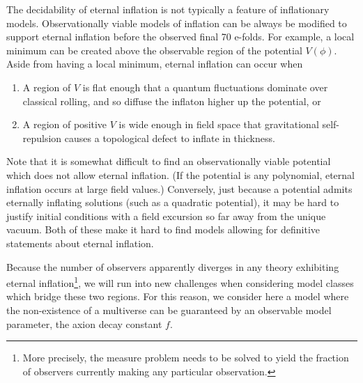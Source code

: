 \documentclass[aps,amsfonts,amsmath,prd,preprint,nofootinbib,superscriptaddress]{revtex4}
\begin{document}
The decidability of eternal inflation is not typically a feature of inflationary models.
 Observationally viable models of inflation can be always be modified to support eternal inflation before the observed final 70 e-folds.   
 For example, a local minimum can be created above the observable region of the potential $V(\phi)$.
 Aside from having a local minimum, eternal inflation can occur when
 \begin{enumerate}
 \item A region of $V$ is flat enough that a quantum fluctuations dominate over classical rolling, and so diffuse the inflaton higher up the potential, or
 \item A region of positive $V$ is wide enough in field space that gravitational self-repulsion causes a topological defect to inflate in thickness.
 \end{enumerate}
 
 Note that it is somewhat difficult to find an observationally viable potential which does not allow eternal inflation\cite{Mukhanov:2014uwa}.  (If the
potential is any polynomial, eternal inflation occurs at large field values.) %
Conversely, just because a potential admits eternally inflating solutions (such as a quadratic potential), it may be hard to justify initial conditions with a field excursion so far away from the unique vacuum.  
Both of these make it hard to find models allowing for definitive statements about eternal inflation.

 
 
Because the number of observers apparently diverges in any theory exhibiting eternal inflation\footnote{More precisely, 
the measure problem needs to be solved to yield the fraction of observers currently making any particular observation.}, 
we will run into new challenges when considering model classes which bridge these two regions.  
For this reason, we consider here a model where the non-existence of a multiverse can be guaranteed by an observable model parameter,  the axion decay constant $f$.
\end{document}
